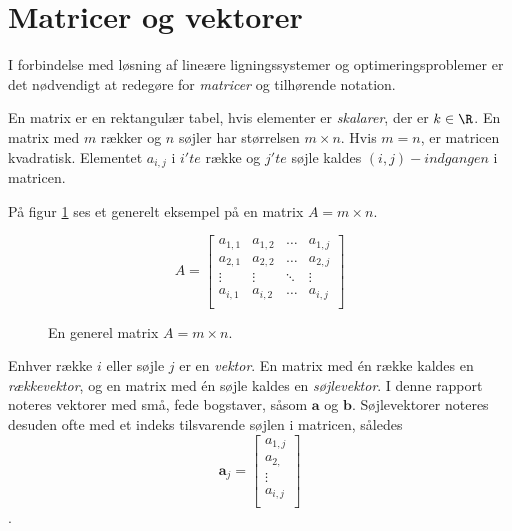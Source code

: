 \section{Matricer og vektorer}


I forbindelse med løsning af lineære ligningssystemer og optimeringsproblemer er det nødvendigt at redegøre for \textit{matricer} og tilhørende notation. 

\begin{defn}{}{}
En matrix er en rektangulær tabel, hvis elementer er \textit{skalarer}, der er $k \in \R$. 
En matrix med $m$ rækker og $n$ søjler har størrelsen $m \times n$.
Hvis $m=n$, er matricen kvadratisk. 
Elementet $a_{i,j}$ i $i'te$ række og $j'te$ søjle kaldes $(i,j)-indgangen$ i matricen. 
\end{defn}


På figur \ref{fig:matrix_gen_eks} ses et generelt eksempel på en matrix $A = m \times n$.

\begin{figure}[H]
	\begin{center}
$$
A=
\begin{bmatrix}
a_{1,1} & a_{1,2} & \ldots & a_{1,j} \\
a_{2,1} & a_{2,2} & \ldots & a_{2,j} \\
\vdots  & \vdots  & \ddots & \vdots \\
a_{i,1} & a_{i,2} & \ldots & a_{i,j} \\
\end{bmatrix}
$$
	\end{center}
	\caption{En generel matrix $A=m \times n$.}
	\label{fig:matrix_gen_eks}
\end{figure}

Enhver række $i$ eller søjle $j$ er en \textit{vektor}. En matrix med én række kaldes en \textit{rækkevektor}, og en matrix med én søjle kaldes en \textit{søjlevektor}. I denne rapport noteres vektorer med små, fede bogstaver, såsom $\textbf{a}$ og $\textbf{b}$. Søjlevektorer noteres desuden ofte med et indeks tilsvarende søjlen i matricen, således 
$$
\textbf{a}_j= 
\begin{bmatrix}
a_{1,j} \\
a_{2,} \\
\vdots \\
a_{i,j} \\
\end{bmatrix}
$$. 










